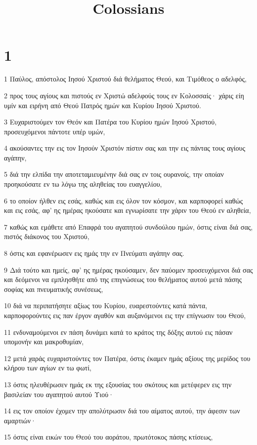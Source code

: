 

\title{Colossians}


\chapter{1}

\par 1 Παύλος, απόστολος Ιησού Χριστού διά θελήματος Θεού, και Τιμόθεος ο αδελφός,
\par 2 προς τους αγίους και πιστούς εν Χριστώ αδελφούς τους εν Κολοσσαίς· χάρις είη υμίν και ειρήνη από Θεού Πατρός ημών και Κυρίου Ιησού Χριστού.
\par 3 Ευχαριστούμεν τον Θεόν και Πατέρα του Κυρίου ημών Ιησού Χριστού, προσευχόμενοι πάντοτε υπέρ υμών,
\par 4 ακούσαντες την εις τον Ιησούν Χριστόν πίστιν σας και την εις πάντας τους αγίους αγάπην,
\par 5 διά την ελπίδα την αποτεταμιευμένην διά σας εν τοις ουρανοίς, την οποίαν προηκούσατε εν τω λόγω της αληθείας του ευαγγελίου,
\par 6 το οποίον ήλθεν εις εσάς, καθώς και εις όλον τον κόσμον, και καρποφορεί καθώς και εις εσάς, αφ' ης ημέρας ηκούσατε και εγνωρίσατε την χάριν του Θεού εν αληθεία,
\par 7 καθώς και εμάθετε από Επαφρά του αγαπητού συνδούλου ημών, όστις είναι διά σας, πιστός διάκονος του Χριστού,
\par 8 όστις και εφανέρωσεν εις ημάς την εν Πνεύματι αγάπην σας.
\par 9 Διά τούτο και ημείς, αφ' ης ημέρας ηκούσαμεν, δεν παύομεν προσευχόμενοι διά σας και δεόμενοι να εμπλησθήτε από της επιγνώσεως του θελήματος αυτού μετά πάσης σοφίας και πνευματικής συνέσεως,
\par 10 διά να περιπατήσητε αξίως του Κυρίου, ευαρεστούντες κατά πάντα, καρποφορούντες εις παν έργον αγαθόν και αυξανόμενοι εις την επίγνωσιν του Θεού,
\par 11 ενδυναμούμενοι εν πάση δυνάμει κατά το κράτος της δόξης αυτού εις πάσαν υπομονήν και μακροθυμίαν,
\par 12 μετά χαράς ευχαριστούντες τον Πατέρα, όστις έκαμεν ημάς αξίους της μερίδος του κλήρου των αγίων εν τω φωτί,
\par 13 όστις ηλευθέρωσεν ημάς εκ της εξουσίας του σκότους και μετέφερεν εις την βασιλείαν του αγαπητού αυτού Υιού·
\par 14 εις τον οποίον έχομεν την απολύτρωσιν διά του αίματος αυτού, την άφεσιν των αμαρτιών·
\par 15 όστις είναι εικών του Θεού του αοράτου, πρωτότοκος πάσης κτίσεως,
